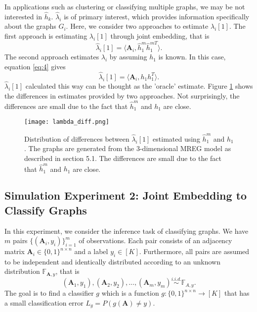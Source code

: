 \documentclass[10pt,journal,compsoc]{IEEEtran}
\newcommand{\bA}{\mathbf{A}}
\begin{document}
\noindent In applications such as clustering or classifying multiple graphs, we may be not interested in $\hat{h}_k$. $\hat{\lambda}_i$ is of primary interest, which provides information specifically about the graphs $G_i$. Here, we consider two approaches to estimate $\lambda_i[1]$. The first approach is estimating $\lambda_i[1]$ through joint embedding, that is
\[ \hat{\lambda}_i[1] = \langle \bA_i,  \hat{h}^m_1 \hat{h}^{m T}_1 \rangle. \]
The second approach estimates $\lambda_i$ by assuming $h_1$ is known. In this case, equation \eqref{eq:4} gives 
\[ \hat{\lambda}_i[1] = \langle \bA_i,  h_1 h_1^T \rangle. \]
$\hat{\lambda}_i[1]$ calculated this way can be thought as the 'oracle' estimate. Figure \ref{fig:ld} shows the differences in estimates provided by two approaches. Not surprisingly, the differences are small due to the fact that $\hat{h}_1^m$ and $h_1$ are close.
\begin{figure}[!htbp]
	\centering
	\texttt{[image: lambda\_diff.png]}
	\caption{Distribution of differences between $\hat{\lambda}_i[1]$ estimated using $\hat{h}_1^m$ and $h_1$. The graphs are generated from the $3$-dimensional MREG model as described in section 5.1. The differences are small due to the fact that $\hat{h}_1^m$ and $h_1$ are close.}
	\label{fig:ld}
\end{figure}

\subsection{Simulation Experiment 2: Joint Embedding to Classify Graphs}
In this experiment, we consider the inference task of classifying graphs.  We have $m$ pairs $\{(\bA_i,y_i)\}_{i=1}^{m}$ of observations. Each pair consists of an adjacency matrix $\bA_i \in \{0,1\}^{n \times n}$ and a label $y_i \in [K]$. Furthermore, all pairs are assumed to be independent and identically distributed according to an unknown distribution $\mathbb{F}_{\bA,y}$, that is
\[(\bA_1,y_1),(\bA_2,y_2),...,(\bA_m,y_m) \overset{i.i.d.}{\sim} \mathbb{F}_{A,y}. \] 
The goal is to find a classifier $g$ which is a function $g:\{0,1\}^{n \times n} \rightarrow [K]$ that has a small classification error $L_g=P(g(\bA)\neq y)$. \\ 
\end{document}

